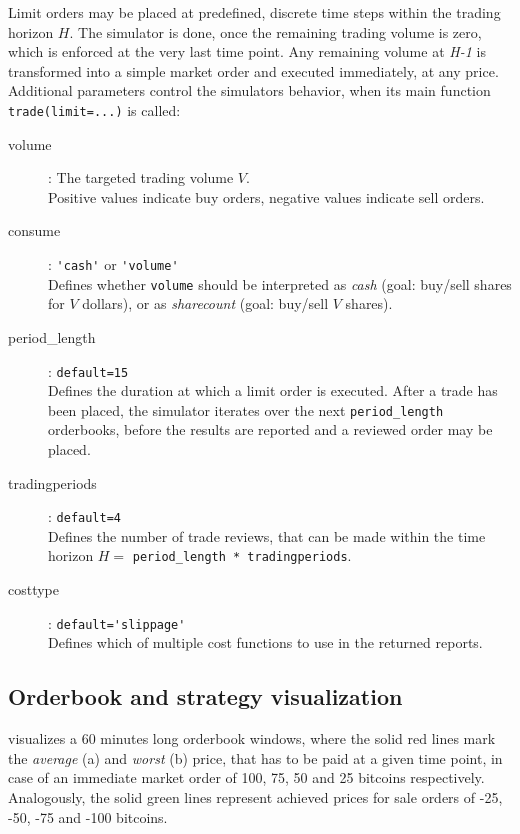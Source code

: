 Limit orders may be placed at predefined, discrete time steps within the trading horizon $H$. The simulator is done, once the remaining trading volume is zero, which is enforced at the very last time point. Any remaining volume at \emph{H-1} is transformed into a simple market order and executed immediately, at any price. Additional parameters control the simulators behavior, when its main function \lstinline!trade(limit=...)! is called:

\begin{description}
\item[volume $$] : The targeted trading volume $V$.\\
Positive values indicate buy orders, negative values indicate sell orders.
\item[consume] : \lstinline!'cash'! or \lstinline!'volume'!\\
Defines whether \lstinline!volume! should be interpreted as \emph{cash} (goal: buy/sell shares for $V$ dollars), or as \emph{sharecount} (goal: buy/sell $V$ shares).
\item[period\_length] : \lstinline!default=15!\\
Defines the duration at which a limit order is executed. After a trade has been placed, the simulator iterates over the next \lstinline!period_length! orderbooks, before the results are reported and a reviewed order may be placed.

\item[tradingperiods] : \lstinline!default=4!\\
Defines the number of trade reviews, that can be made within the time horizon $H =$ \lstinline!period_length * tradingperiods!.

\item[costtype] : \lstinline!default='slippage'!\\
Defines which of multiple cost functions to use in the returned reports. 
\end{description}

\subsection{Orderbook and strategy visualization}

 visualizes a 60 minutes long orderbook windows, where the solid red lines mark the \emph{average} (a) and \emph{worst} (b) price, that has to be paid at a given time point, in case of an immediate market order of 100, 75, 50 and 25 bitcoins respectively. Analogously, the solid green lines represent achieved prices for sale orders of -25, -50, -75 and -100 bitcoins.\\

